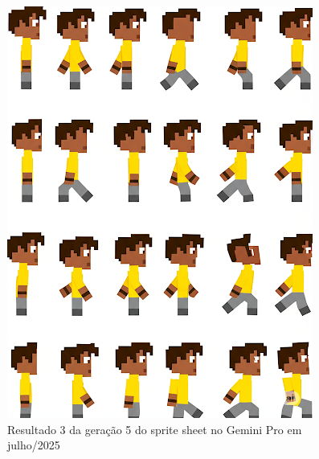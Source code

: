\begin{figure}[htbp]
    \centering
    \caption{\small Resultado 3 da geração 5 do sprite sheet no Gemini Pro em julho/2025}
    \label{fig:geminiProSheet5_3}
        \includegraphics[width=0.8\linewidth]{figs/geminiPro/chat10/tela1_res3.PNG}
\end{figure}